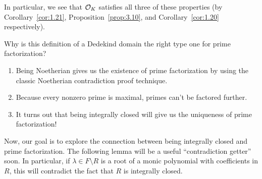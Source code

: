 In particular, we see that ${\cal O}_K$ satisfies all three of these 
properties (by Corollary~\ref{cor:1.21}, Proposition~\ref{prop:3.10}, 
and Corollary~\ref{cor:1.20} respectively). 

Why is this definition of a Dedekind domain the right type one 
for prime factorization? 
\begin{enumerate}[(1)]
    \item Being Noetherian gives us the existence of prime 
    factorization by using the classic Noetherian contradiction proof technique.
    \item Because every nonzero prime is maximal, primes can't be factored further.
    \item It turns out that being integrally closed will give us the uniqueness 
    of prime factorization!
\end{enumerate}
Now, our goal is to explore the connection between being integrally closed 
and prime factorization. The following lemma will be a useful ``contradiction 
getter'' soon. In particular, if $\lambda \in F \setminus R$ is a root of a 
monic polynomial with coefficients in $R$, this will contradict the 
fact that $R$ is integrally closed.

